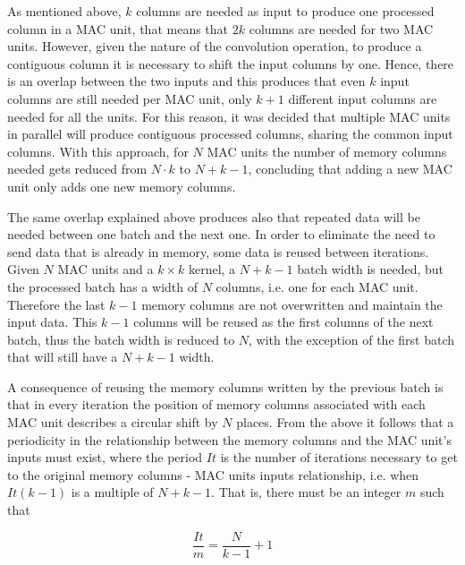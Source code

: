 \documentclass[conference,compsoc]{IEEEtran}
\begin{document}
As mentioned above, $k$ columns are needed as input to produce one processed
column in a MAC unit, that means that $2k$ columns are needed for two
MAC units. However, given the nature of the convolution operation, to
produce a contiguous column it is necessary to shift the input columns by one.
Hence, there is an overlap between the two inputs and this produces that even $k$ input columns are still needed per MAC unit, only
$k+1$ different input columns are needed for all the units. For this reason, it was decided that
multiple MAC units in parallel will produce contiguous processed
columns, sharing the common input columns. With this approach, for $N$
MAC units the number of memory columns needed gets reduced from $N\cdot
k$ to $N+k-1$, concluding that adding a new MAC unit only adds one new
memory columns.

The same overlap explained above produces also that repeated data will be needed
between one batch and the next one. In order to eliminate the need to send data
that is already in memory, some data is reused between iterations. Given $N$ MAC
units and a $k\times k$ kernel, a $N+k-1$ batch width is needed, but the
processed batch has a width of $N$ columns, i.e. one for each MAC unit. 
Therefore the last $k-1$ memory columns are not overwritten and maintain the
input data. This $k-1$ columns will be reused as the first columns of the 
next batch, thus the batch width is reduced to $N$, with the exception of
the first batch that will still have a $N+k-1$ width.

A consequence of reusing the memory columns written by the previous batch is
that in every iteration the position of memory columns associated with each
MAC unit describes a circular shift by $N$ places. From the above it
follows that a periodicity in the relationship between the memory columns and the
MAC unit's inputs must exist, where the period $It$ is the number of
iterations necessary to get to the original memory columns - MAC units
inputs relationship, i.e. when $It(k-1)$ is a multiple of $N+k-1$. That is, there
must be an integer $m$ such that 

\begin{equation}\label{niter}
  \frac{It}{m} = \frac{N}{k-1} + 1
\end{equation}
\end{document}
